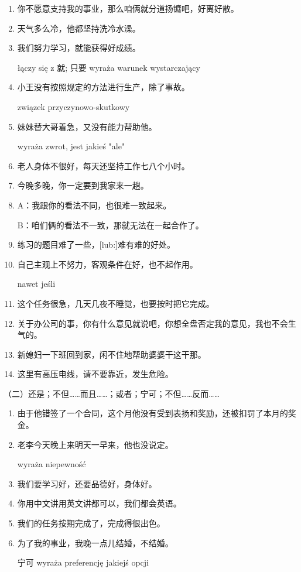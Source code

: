 \begin{enumerate} 

\item {}你不愿意支持我的事业，那么咱俩就分道扬镳吧，好离好散。%
\item {}天气多么冷，他都坚持洗冷水澡。%
\item 我们努力学习，就能获得好成绩。%

łączy się z 就; 只要 wyraża warunek wystarczający
\item 小王没有按照规定的方法进行生产，除了事故。 %

związek przyczynowo-skutkowy
\item 妹妹替大哥着急，又没有能力帮助他。 %

wyraża zwrot, jest jakieś "ale"
\item 老人身体不很好，每天还坚持工作七八个小时。 %
\item 今晚多晚，你一定要到我家来一趟。 %
\item A：我跟你的看法不同，也很难一致起来。 %

B：咱们俩的看法不一致，那就无法在一起合作了。
\item 练习的题目难了一些，[lub:]难有难的好处。%
\item 自己主观上不努力，客观条件在好，也不起作用。 %

nawet jeśli
\item 这个任务很急，几天几夜不睡觉，也要按时把它完成。%
\item 关于办公司的事，你有什么意见就说吧，你想全盘否定我的意见，我也不会生气的。 %
\item 新媳妇一下班回到家，闲不住地帮助婆婆干这干那。 %
\item 这里有高压电线，请不要靠近，发生危险。 %
\end{enumerate}

（二）还是；不但……而且……；或者；宁可；不但……反而……
\begin{enumerate}
\item 由于他错签了一个合同，这个月他没有受到表扬和奖励，还被扣罚了本月的奖金。 %
\item 老李今天晚上来明天一早来，他也没说定。 %

wyraża niepewność
\item 我们要学习好，还要品德好，身体好。 %
\item 你用中文讲用英文讲都可以，我们都会英语。 %
\item 我们的任务按期完成了，完成得很出色。 %
\item 为了我的事业，我晚一点儿结婚，不结婚。 %

宁可 wyraża preferencję jakiejś opcji
\end{enumerate}